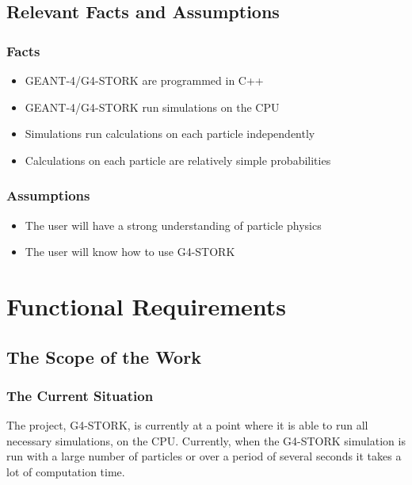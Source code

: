 \documentclass[12pt]{article}
\begin{document}
\subsection{Relevant Facts and Assumptions} %
\subsubsection{Facts}
\begin{itemize}
\item GEANT-4/G4-STORK are programmed in C++
\item GEANT-4/G4-STORK run simulations on the CPU
\item Simulations run calculations on each particle independently
\item Calculations on each particle are relatively simple probabilities
\end{itemize}

\subsubsection{Assumptions}
\begin{itemize}
\item The user will have a strong understanding of particle physics
\item The user will know how to use G4-STORK
\end{itemize}

\section{Functional Requirements}

\subsection{The Scope of the Work} %
\subsubsection{The Current Situation}
The project, G4-STORK, is currently at a point where it is able to run all necessary simulations, on the CPU. Currently, when the G4-STORK simulation is run with a large number of particles or over a period of several seconds it takes a lot of computation time.
\end{document}
